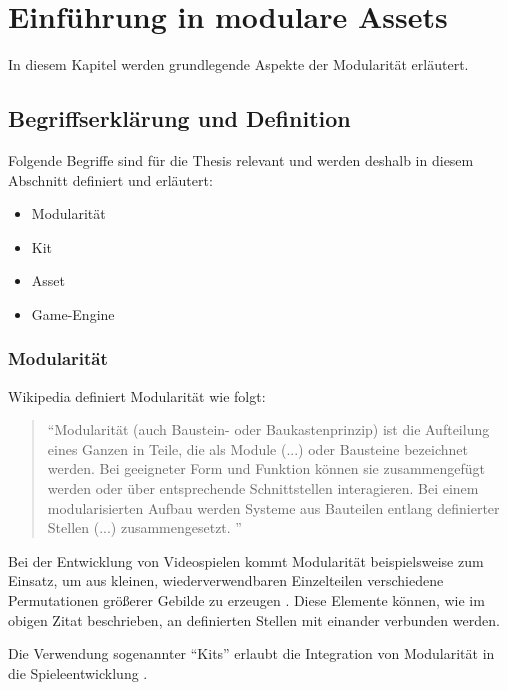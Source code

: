 \chapter{Einführung in modulare Assets}
In diesem Kapitel werden grundlegende Aspekte der Modularität erläutert.
\section{Begriffserklärung und Definition}
Folgende Begriffe sind für die Thesis relevant und werden deshalb in diesem Abschnitt definiert und erläutert:
\begin{itemize}
\item Modularität
\item Kit
\item Asset
\item Game-Engine
\end{itemize}
\subsection{Modularität}
Wikipedia definiert Modularität wie folgt:
\begin{quote}
\enquote{Modularität (auch Baustein- oder Baukastenprinzip) ist die Aufteilung eines Ganzen in Teile, die als Module (...) oder Bausteine bezeichnet werden. Bei geeigneter Form und Funktion können sie zusammengefügt werden oder über entsprechende Schnittstellen interagieren. Bei einem modularisierten Aufbau werden Systeme aus Bauteilen entlang definierter Stellen (...) zusammengesetzt.
} \parencite{moduwiki}
\end{quote}
Bei der Entwicklung von Videospielen kommt Modularität beispielsweise zum Einsatz, um aus kleinen, wiederverwendbaren Einzelteilen verschiedene Permutationen größerer Gebilde zu erzeugen \parencite{Meler}. Diese Elemente können, wie im obigen Zitat beschrieben, an definierten Stellen mit einander verbunden werden.
\par
Die Verwendung sogenannter \enquote{Kits} erlaubt die Integration von Modularität in die Spieleentwicklung \parencite{Burgess}.
\newpage
